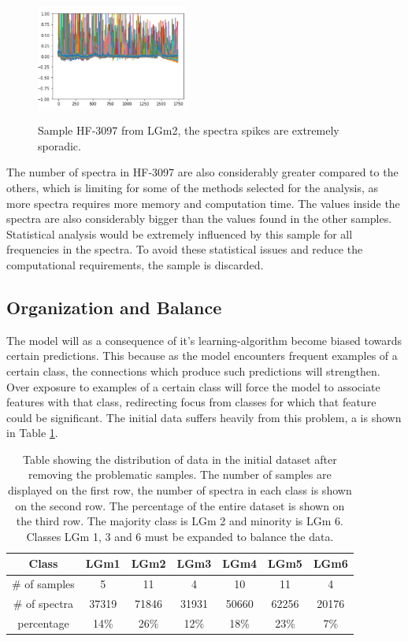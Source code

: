 \begin{figure}[H]

    \centering
{\includegraphics[width=5cm]{images/HF_3097.JPG} }
\caption{Sample HF-3097 from LGm2, the spectra spikes are extremely sporadic.\label{fig:HF3097}}%

\end{figure}

The number of spectra in HF-3097 are also considerably greater compared to the others, which is limiting for some of the methods selected for the analysis, as more spectra requires more memory and computation time. The values inside the spectra are also considerably bigger than the values found in the other samples. Statistical analysis would be extremely influenced by this sample for all frequencies in the spectra. To avoid these statistical issues and reduce the computational requirements, the sample is discarded.

\subsection{Organization and Balance}
The model will as a consequence of it's learning-algorithm become biased towards certain predictions. This because as the model encounters frequent examples of a certain class, the connections which produce such predictions will strengthen. Over exposure to examples of a certain class will force the model to associate features with that class, redirecting focus from classes for which that feature could be significant. The initial data suffers heavily from this problem, a is shown in Table \ref{table:1}.

\begin{table}[h!]
\centering
 \begin{tabular}{||c c c c c c c||} 
 \hline
 Class & LGm1 & LGm2 & LGm3 & LGm4 & LGm5 & LGm6 \\ [0.5ex] 
 \hline\hline
 \# of samples & 5& 11 & 4 & 10 & 11 & 4 \\ 
 \hline
 \# of spectra & 37319 & 71846 & 31931 & 50660 & 62256 & 20176 \\
 \hline
 percentage & 14\%& 26\% & 12\% & 18\% & 23\% & 7\% \\
 \hline

\end{tabular}
\caption{Table showing the distribution of data in the initial dataset after removing the problematic samples. The number of samples are displayed on the first row, the number of spectra in each class is shown on the second row. The percentage of the entire dataset is shown on the third row. The majority class is LGm 2 and minority is LGm 6.  Classes LGm 1, 3 and 6 must be expanded to balance the data.}
\label{table:1}
\end{table}

